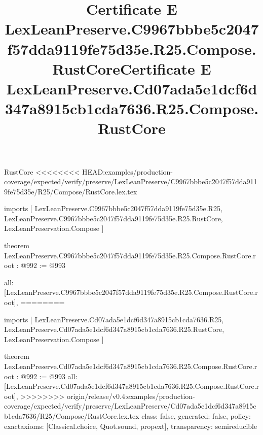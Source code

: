 \begin{lexlean}{RustCore}
<<<<<<<< HEAD:examples/production-coverage/expected/verify/preserve/LexLeanPreserve/C9967bbbe5c2047f57dda9119fe75d35e/R25/Compose/RustCore.lex.tex
\title{Certificate E LexLeanPreserve.C9967bbbe5c2047f57dda9119fe75d35e.R25.Compose.RustCore}
\begin{coremodule}
imports [
  LexLeanPreserve.C9967bbbe5c2047f57dda9119fe75d35e.R25,
  LexLeanPreserve.C9967bbbe5c2047f57dda9119fe75d35e.R25.RustCore,
  LexLeanPreservation.Compose
]

theorem LexLeanPreserve.C9967bbbe5c2047f57dda9119fe75d35e.R25.Compose.RustCore.root : @992 := @993 {
  all: [LexLeanPreserve.C9967bbbe5c2047f57dda9119fe75d35e.R25.Compose.RustCore.root],
========
\title{Certificate E LexLeanPreserve.Cd07ada5e1dcf6d347a8915cb1cda7636.R25.Compose.RustCore}
\begin{coremodule}
imports [
  LexLeanPreserve.Cd07ada5e1dcf6d347a8915cb1cda7636.R25,
  LexLeanPreserve.Cd07ada5e1dcf6d347a8915cb1cda7636.R25.RustCore,
  LexLeanPreservation.Compose
]

theorem LexLeanPreserve.Cd07ada5e1dcf6d347a8915cb1cda7636.R25.Compose.RustCore.root : @992 := @993 {
  all: [LexLeanPreserve.Cd07ada5e1dcf6d347a8915cb1cda7636.R25.Compose.RustCore.root],
>>>>>>>> origin/release/v0.4:examples/production-coverage/expected/verify/preserve/LexLeanPreserve/Cd07ada5e1dcf6d347a8915cb1cda7636/R25/Compose/RustCore.lex.tex
  class: false,
  generated: false,
  policy: exact{axioms: [Classical.choice, Quot.sound, propext]},
  transparency: semireducible
}


\end{coremodule}}
\end{coremodule}
\end{lexlean}
